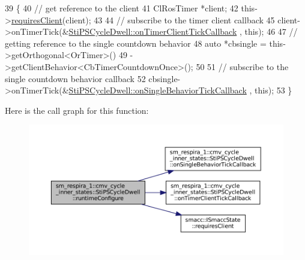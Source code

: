 \begin{DoxyCode}
39   \{
40     \textcolor{comment}{// get reference to the client}
41     ClRosTimer *client;
42     this->\hyperlink{classsmacc_1_1ISmaccState_a7f95c9f0a6ea2d6f18d1aec0519de4ac}{requiresClient}(client);
43 
44     \textcolor{comment}{// subscribe to the timer client callback}
45     client->onTimerTick(&\hyperlink{structsm__respira__1_1_1cmv__cycle__inner__states_1_1StiPSCycleDwell_afe30abee5a61aa4c170db555ec7e2697}{StiPSCycleDwell::onTimerClientTickCallback}
      , \textcolor{keyword}{this});
46 
47     \textcolor{comment}{// getting reference to the single countdown behavior}
48     \textcolor{keyword}{auto} *cbsingle = this->getOrthogonal<OrTimer>()
49                           ->getClientBehavior<CbTimerCountdownOnce>();
50 
51     \textcolor{comment}{// subscribe to the single countdown behavior callback}
52     cbsingle->onTimerTick(&\hyperlink{structsm__respira__1_1_1cmv__cycle__inner__states_1_1StiPSCycleDwell_ae7223830d6879b3b7c35e072ed98b365}{StiPSCycleDwell::onSingleBehaviorTickCallback}
      , \textcolor{keyword}{this});
53   \}
\end{DoxyCode}
Here is the call graph for this function\+:
\nopagebreak
\begin{figure}[H]
\begin{center}
\leavevmode
\includegraphics[width=350pt]{structsm__respira__1_1_1cmv__cycle__inner__states_1_1StiPSCycleDwell_a1cbdbf655b548f4999c36faef3ba0528_cgraph}
\end{center}
\end{figure}
\mbox{\label{structsm__respira__1_1_1cmv__cycle__inner__states_1_1StiPSCycleDwell_affbf6e274207cc248d0ad59d0177172c}} 
